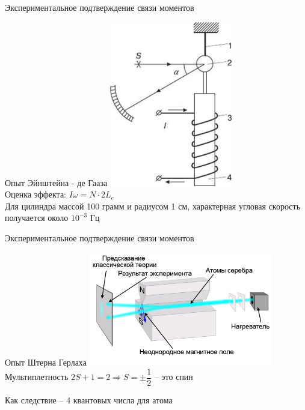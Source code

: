 \documentclass[12]{beamer}
\begin{document}
\begin{frame}[t]{Экспериментальное подтверждение связи  моментов}
\begin{block}{Опыт Эйнштейна - де Гааза}
\centering
\includegraphics[width=0.4\textwidth]{Seminar_07/pics/pic_de_gaaz.png}
\\
Оценка эффекта:
$I\omega = N\cdot 2L_{e}$\\
Для цилиндра массой 100 грамм и радиусом 1 см, характерная угловая скорость получается около $10^{-3}$ Гц
\end{block}
\end{frame}

\begin{frame}[t]{Экспериментальное подтверждение связи  моментов}
\begin{block}{Опыт Штерна Герлаха}
\centering
\includegraphics[width=0.6\textwidth]{Seminar_07/pics/pic_02.png}
\\
Мультиплетность $2S+1=2 \Rightarrow S = \pm \dfrac{1}{2}$ -- это спин 

Как следствие -- 4 квантовых числа для атома 
\end{block}
\end{frame}
\end{document}

